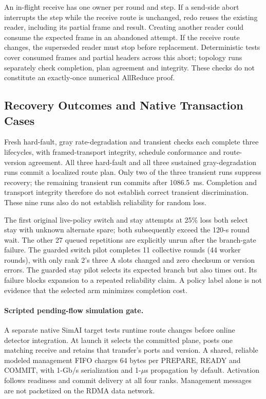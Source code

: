 \documentclass[sigconf]{acmart}
\begin{document}
An in-flight receive has one owner per round and step. If a send-side
abort interrupts the step while the receive route is unchanged, redo
reuses the existing reader, including its partial frame and result.
Creating another reader could consume the expected frame in an abandoned
attempt. If the receive route changes, the superseded reader must stop
before replacement. Deterministic tests cover consumed frames and
partial headers across this abort; topology runs separately check
completion, plan agreement and integrity. These checks do not constitute
an exactly-once numerical AllReduce proof.

\subsection{Recovery Outcomes and Native Transaction Cases}
Fresh hard-fault, gray rate-degradation and transient checks each
complete three lifecycles, with framed-transport integrity, schedule
conformance and route-version agreement. All three hard-fault and all
three sustained gray-degradation runs commit a localized route plan.
Only two of the three transient runs suppress recovery; the remaining
transient run commits after 1086.5~ms. Completion and transport integrity
therefore do not establish correct transient discrimination. These nine
runs also do not establish reliability for random loss.

The first original live-policy switch and stay attempts at 25\% loss
both select stay with unknown alternate spare; both subsequently exceed
the 120-s round wait. The other 27 queued repetitions are explicitly
unrun after the branch-gate failure. The guarded switch pilot completes
11 collective rounds (44 worker rounds), with only rank 2's three A
slots changed and zero checksum or version errors. The guarded stay
pilot selects its expected branch but also times out. Its failure blocks
expansion to a repeated reliability claim. A policy label alone is not
evidence that the selected arm minimizes completion cost.

\paragraph{Scripted pending-flow simulation gate.}
A separate native SimAI target tests runtime route changes before online
detector integration. At launch it selects the committed plane, posts one
matching receive and retains that transfer's ports and version. A shared,
reliable modeled management FIFO charges 64 bytes per PREPARE, READY and
COMMIT, with 1-Gb/s serialization and 1-$\mu$s propagation by default.
Activation follows readiness and commit delivery at all four ranks.
Management messages are not packetized on the RDMA data network.
\end{document}
